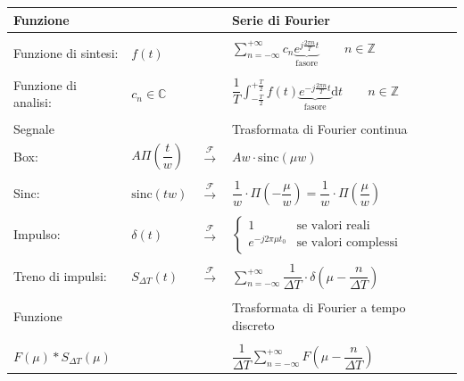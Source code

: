 \documentclass[a4paper]{article}
\begin{document}
	\begin{table}[!htbp]
		\centering
		\begin{tabular}{@{} l l c l @{}}
			\toprule
			Funzione & & & Serie di Fourier \\
			\midrule
			&&& \\
			Funzione di sintesi: & $f(t)$ && $\sum_{n = -\infty}^{+\infty} c_{n} \underbrace{e^{j \frac{2\pi n}{T}t}}_{\text{fasore}} \hspace{2em} n\in\mathbb{Z}$ \\
			&&& \\
			Funzione di analisi: & $c_{n} \in \mathbb{C}$ && $\dfrac{1}{T} \int_{-\frac{T}{2}}^{+\frac{T}{2}} f\left(t\right) \underbrace{e^{-j \frac{2\pi n}{T}t}}_{\text{fasore}} \mathrm{d}t \hspace{2em} n \in \mathbb{Z}$ \\
			&&& \\
			\toprule
			Segnale  & & & Trasformata di Fourier continua \\
			\midrule
			Box:				& $A\Pi\left(\dfrac{t}{w}\right)$	& $\xrightarrow{\mathcal{F}}$ & $Aw \cdot \mathrm{sinc}\left(\mu w\right)$ \\
			&&&\\
			Sinc:				& $\mathrm{sinc}\left(tw\right)$	& $\xrightarrow{\mathcal{F}}$ & $\dfrac{1}{w}\cdot\Pi \left(-\dfrac{\mu}{w}\right) = \dfrac{1}{w}\cdot \Pi\left(\dfrac{\mu}{w}\right)$ \\
			&&&\\
			Impulso:			& $\delta\left(t\right)$			& $\xrightarrow{\mathcal{F}}$ &
			$\begin{cases}
				1 						& \text{se valori reali}\\
				e^{-j 2 \pi \mu t_{0}}	& \text{se valori complessi}
			\end{cases}$ \\
			&&& \\
			Treno di impulsi:	& $S_{\Delta T}\left(t\right)$ 		& $\xrightarrow{\mathcal{F}}$ & $\displaystyle\sum_{n = -\infty}^{+\infty} \dfrac{1}{\Delta T} \cdot \delta \left(\mu - \dfrac{n}{\Delta T}\right)$ \\
			&&& \\
			\toprule
			Funzione & & & Trasformata di Fourier a tempo discreto \\
			\midrule
			&&& \\
			$F\left(\mu\right) * S_{\Delta T}\left(\mu\right)$ & & & $\dfrac{1}{\Delta T} \sum_{n = -\infty}^{+\infty} F \left(\mu - \dfrac{n}{\Delta T}\right)$ \\

\end{tabular}
\end{table}
\end{document}
